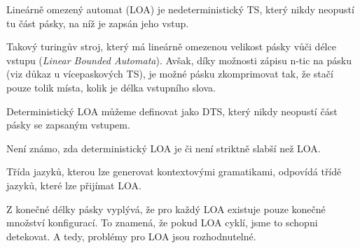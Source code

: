 \begin{compactitem}
    \item Lineárně omezený automat (LOA) je nedeterministický TS, který nikdy neopustí tu část pásky, na níž je zapsán jeho vstup. \begin{compactitem}
        \item Takový turingův stroj, který má lineárně omezenou velikost pásky vůči délce vstupu (\textit{Linear Bounded Automata}). Avšak, díky možnosti zápisu n-tic na pásku (viz důkaz u vícepaskových TS), je možné pásku zkomprimovat tak, že stačí pouze tolik místa, kolik je délka vstupního slova.
    \end{compactitem}

    \item Deterministický LOA můžeme definovat jako DTS, který nikdy neopustí část pásky se zapsaným vstupem. \begin{compactitem}
        \item Není známo, zda deterministický LOA je či není striktně slabší než LOA.
    \end{compactitem}

    \item Třída jazyků, kterou lze generovat kontextovými gramatikami, odpovídá třídě jazyků, které lze přijímat LOA.

    \item Z konečné délky pásky vyplývá, že pro každý LOA existuje pouze konečné množství konfigurací. To znamená, že pokud LOA cyklí, jsme to schopni detekovat. A tedy, problémy pro LOA jsou rozhodnutelné.
\end{compactitem}



